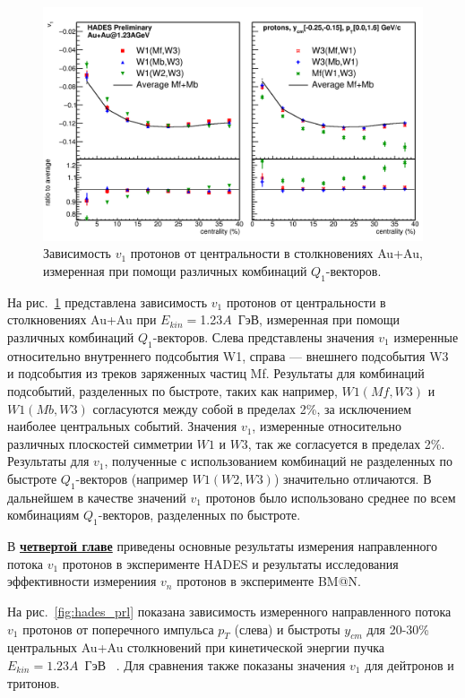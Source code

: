 \begin{figure}[h]
\begin{center}
\includegraphics[width=0.65\linewidth]{images/W1AndW3Nucleus.png}
\caption{Зависимость $v_1$ протонов от центральности  в столкновениях Au+Au,
  измеренная при помощи различных комбинаций $Q_1$-векторов. }
\label{fig:hades_w1w3}
\end{center}
\end{figure}
На рис.~\ref{fig:hades_w1w3} представлена зависимость  $v_1$ протонов от центральности  в столкновениях Au+Au при $E_{kin}=$1.23$A$~ГэВ, измеренная при помощи различных комбинаций $Q_1$-векторов. 
Слева представлены значения $v_1$ измеренные относительно внутреннего подсобытия W1, справа --- внешнего подсобытия W3 и подсобытия из треков заряженных частиц Mf. 
Результаты для комбинаций подсобытий, разделенных по быстроте, таких как например, $W1(Mf,W3)$ и $W1(Mb,W3)$ согласуются между собой в пределах 2\%, за исключением наиболее центральных событий. 
Значения $v_1$, измеренные относительно различных плоскостей симметрии $W1$ и $W3$, так же согласуется в пределах 2\%.
Результаты для $v_1$, полученные с использованием комбинаций не разделенных по быстроте $Q_1$-векторов (например $W1(W2,W3)$) значительно отличаются.
В дальнейшем в качестве значений $v_1$ протонов было использовано среднее по всем комбинациям $Q_1$-векторов, разделенных по быстроте.

В  \underline{\textbf{четвертой главе}} приведены основные результаты измерения направленного потока $v_1$ протонов в  эксперименте HADES и результаты исследования эффективности измерениия $v_n$ протонов в
эксперименте BM@N.

На рис.~\ref{fig:hades_prl} показана зависимость измеренного направленного потока  $v_1$ протонов от поперечного импульса $p_T$ (слева) и быстроты $y_{cm}$ для 20-30\% центральных Au+Au столкновений при кинетической энергии пучка $E_{kin}=1.23A$~ГэВ ~\cite{HADES:2020lob}. 
Для сравнения также показаны значения $v_1$   для дейтронов и тритонов.

